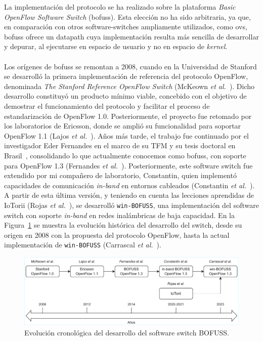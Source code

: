La implementación del protocolo se ha realizado sobre la plataforma \textit{Basic OpenFlow Software Switch} (\gls{bofuss}). Esta elección no ha sido arbitraria, ya que, en comparación con otros software-switches ampliamente utilizados, como \gls{ovs}, \gls{bofuss} ofrece un datapath cuya implementación resulta más sencilla de desarrollar y depurar, al ejecutarse en espacio de usuario y no en espacio de \textit{kernel}.\\
\\
Los orígenes de \gls{bofuss} se remontan a 2008, cuando en la Universidad de Stanford se desarrolló la primera implementación de referencia del protocolo OpenFlow, denominada \textit{The Stanford Reference OpenFlow Switch} (McKeown \textit{et al.}~\cite{mckeown2008openflow}). Dicho desarrollo constituyó un producto mínimo viable, concebido con el objetivo de demostrar el funcionamiento del protocolo y facilitar el proceso de estandarización de OpenFlow 1.0. Posteriormente, el proyecto fue retomado por los laboratorios de Ericsson, donde se amplió su funcionalidad para soportar OpenFlow 1.1 (Lajos \textit{et al.}~\cite{of11softswitch}). Años más tarde, el trabajo fue continuado por el investigador Eder Fernandes en el marco de su TFM y su tesis doctoral en Brasil~\cite{fernandes2014openflow}, consolidando lo que actualmente conocemos como \gls{bofuss}, con soporte para OpenFlow 1.3 (Fernandes \textit{et al.}~\cite{fernandes2020road}). Posteriormente, este software switch fue extendido por mi compañero de laboratorio, Constantin, quien implementó capacidades de comunicación \textit{in-band} en entornos cableados (Constantin \textit{et al.}~\cite{constantin2020desarrollo}). A partir de esta última versión, y teniendo en cuenta las lecciones aprendidas de IoTorii (Rojas \textit{et al.}~\cite{rojas2021outperforming}), se desarrolló \texttt{win-BOFUSS}, una implementación del software switch con soporte \textit{in-band} en redes inalámbricas de baja capacidad. En la Figura~\ref{fig:in_band_5} se muestra la evolución histórica del desarrollo del switch, desde su origen en 2008 con la propuesta del protocolo OpenFlow, hasta la actual implementación de \texttt{win-BOFUSS} (Carrascal \textit{et al.}~\cite{carrascal2023scalable}).

\begin{figure}[ht!]
    \centering
    \includegraphics[width=\textwidth]{fig/04_in-band/in_band_5.drawio.pdf}
    \caption{Evolución cronológica del desarrollo del software switch BOFUSS.} 
    \label{fig:in_band_5}
\end{figure}

